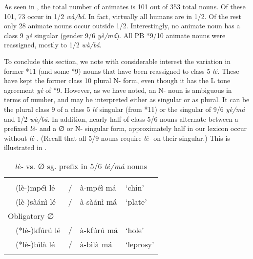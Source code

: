 \documentclass[output=paper,,modfonts,nonflat]{langsci/langscibook}
\begin{document}
As seen in , the total number of animates is 101 out of 353 total nouns. Of these 101, 73 occur in 1/2 \textit{wà/bá}. In fact, virtually all humans are in 1/2. Of the rest only 28 animate nouns occur outside 1/2. Interestingly, no animate noun has a class 9 \textit{yè} singular (gender 9/6 \textit{yè/má}). All PB *9/10 animate nouns were reassigned, mostly to 1/2 \textit{wà/bá}.

To conclude this section, we note with considerable interest the variation in former *11 (and some *9) nouns that have been reassigned to class 5 \textit{lé}. These have kept the former class 10 plural N- form, even though it has the L tone agreement \textit{yè} of *9. However, as we have noted, an N- noun is ambiguous in terms of number, and may be interpreted either as singular or as plural. It can be the plural class 9 of a class 5 \textit{lé} singular (from *11) or the singular of 9/6 \textit{yè/má} and 1/2 \textit{wà/bá}. In addition, nearly half of class 5/6 nouns alternate between a prefixed \textit{lè-} and a ∅ or N- singular form, approximately half in our lexicon occur without \textit{lè-}. (Recall that all 5/9 nouns require \textit{lè-} on their singular.) This is illustrated in .\largerpage


\begin{table}[H]
\caption{\textit{lè-} vs. ∅ sg. prefix in 5/6 \textit{lé/má} nouns}
\label{table16}
\begin{small}
\begin{tabular}[t]{l		l		l		l		l}
\lsptoprule	
\multicolumn{5}{l}{Optional ∅}							\\
	&	(lè-)mpéì lé	&	/	&	à-mpéì má	&	‘chin’	\\
	&	(lè-)sàánì lé	&	/	&	à-sàánì má	&	‘plate’	\\[0.2cm]
\multicolumn{5}{l}{Obligatory ∅}							\\
	&	(*lè-)kfúrú lé	&	/	&	à-kfúrú má	&	‘hole’	\\
	&	(*lè-)bìlà lé	&	/	&	à-bìlà má	&	‘leprosy’	\\
\lspbottomrule
\end{tabular}
\end{small}
\end{table}
\end{document}
